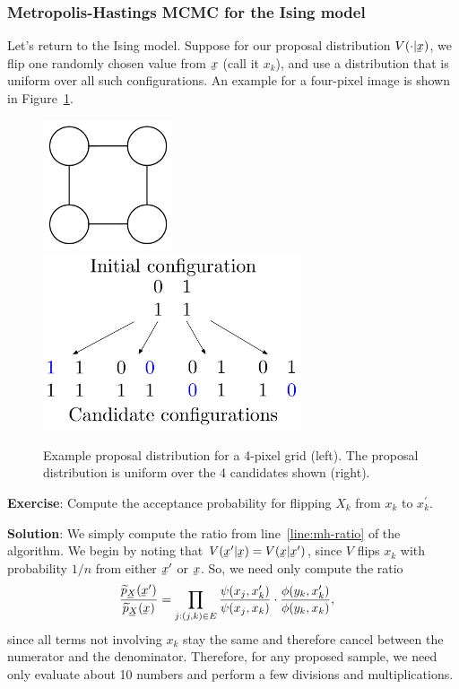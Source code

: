 \documentclass[12pt]{article}
\newcommand{\bunderline}[2][4]{\underline{#2\mkern-#1mu}\mkern#1mu}
\newcommand{\uX}{{\bunderline{X}}}
\newcommand{\ux}{{\bunderline{x}}}
\newcommand{\tp}{\widetilde{p}}
\begin{document}
    \subsubsection{Metropolis-Hastings MCMC for the Ising model}
    Let's return to the Ising model. Suppose for our proposal distribution
    $V(\cdot|\ux)$, we flip one randomly chosen value from $\ux$ (call it
    $x_k$), and use a distribution that is uniform over all such configurations.
    An example for a four-pixel image is shown in Figure~\ref{fig:proposal}.

    \begin{figure}
        \centering
        \includegraphics[width=1.5in]{figs/grid-mrf-small.pdf}
        \quad
        \includegraphics[width=3in]{figs/proposal-distribution.pdf}
        \caption{Example proposal distribution for a 4-pixel grid (left). The proposal
            distribution is uniform over the 4 candidates shown (right).}
        \label{fig:proposal}
    \end{figure}
    \noindent \textbf{Exercise}: Compute the acceptance probability for flipping $X_k$ from
    $x_k$ to $x_k^\prime$.

    \noindent \textbf{Solution}: We simply compute the ratio from line~\ref{line:mh-ratio}
    of the algorithm. We begin by noting that
    $V(\ux^\prime|\ux)=V(\ux|\ux^\prime)$, since $V$ flips $x_k$ with probability
    $1/n$ from either $\ux^\prime$ or $\ux$. So, we need only compute the ratio
    \begin{align*}
        \frac{\tp_\uX(\ux^\prime)}{\tp_\uX(\ux)} 
        &= \prod_{j: (j,k) \in E} \frac{\psi(x_j,x_k^\prime)}{\psi(x_j, x_k)} \cdot \frac{\phi(y_k, x_k^\prime)}{\phi(y_k, x_k)},
    \end{align*}
    since all terms not involving $x_k$ stay the same and therefore cancel
    between the numerator and the denominator. Therefore, for any proposed
    sample, we need only evaluate about 10 numbers and perform a few divisions
    and multiplications.
\end{document}
